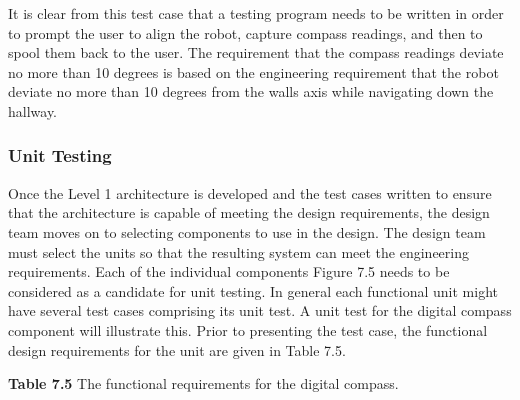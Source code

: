 It is clear from this test case that a testing program needs to be
written in order to prompt the user to align the robot, capture compass
readings, and then to spool them back to the user. The requirement that
the compass readings deviate no more than 10 degrees is based on the
engineering requirement that the robot deviate no more than 10 degrees
from the walls axis while navigating down the hallway.

\subsubsection*{Unit Testing}\label{unit-testing-1}

Once the Level 1 architecture is developed and the test cases written to
ensure that the architecture is capable of meeting the design
requirements, the design team moves on to selecting components to use in
the design. The design team must select the units so that the resulting
system can meet the engineering requirements. Each of the individual
components Figure 7.5 needs to be considered as a candidate for unit
testing. In general each functional unit might have several test cases
comprising its unit test. A unit test for the digital compass component
will illustrate this. Prior to presenting the test case, the functional
design requirements for the unit are given in Table 7.5.

\textbf{Table 7.5} The functional requirements for the digital compass.

